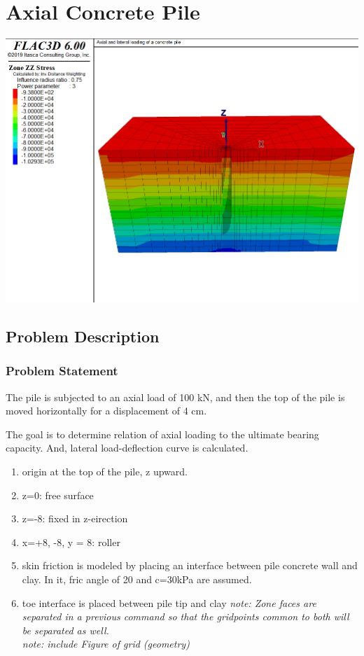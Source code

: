 \documentclass[a4paper, nobind]{templates/ociamthesis}
\providecommand{\tightlist}{%
  \setlength{\itemsep}{0pt}\setlength{\parskip}{0pt}}
\begin{document}
\hypertarget{axial-concrete-pile}{%
\chapter{Axial Concrete Pile}\label{axial-concrete-pile}}

\includegraphics[width=1\linewidth]{myfigureeeeee/h}

\hypertarget{problem-description}{%
\section{Problem Description}\label{problem-description}}

\hypertarget{problem-statement}{%
\subsection{Problem Statement}\label{problem-statement}}

The pile is subjected to an axial load of 100 kN, and then the top of
the pile is moved horizontally for a displacement of 4 cm.

The goal is to determine relation of axial loading to the ultimate
bearing capacity. And, lateral load-deflection curve is calculated.

\begin{enumerate}
\def\labelenumi{\arabic{enumi})}
\tightlist
\item
  origin at the top of the pile, z upward.
\item
  z=0: free surface
\item
  z=-8: fixed in z-eirection
\item
  x=+8, -8, y = 8: roller
\item
  skin friction is modeled by placing an interface between pile
  concrete wall and clay. In it, fric angle of 20 and c=30kPa are
  assumed.
\item
  toe interface is placed between pile tip and clay \emph{note: Zone faces
  are separated in a previous command so that the gridpoints common to
  both will be separated as well.}\\
  \emph{note: include Figure of grid (geometry)}
\end{enumerate}
\end{document}
